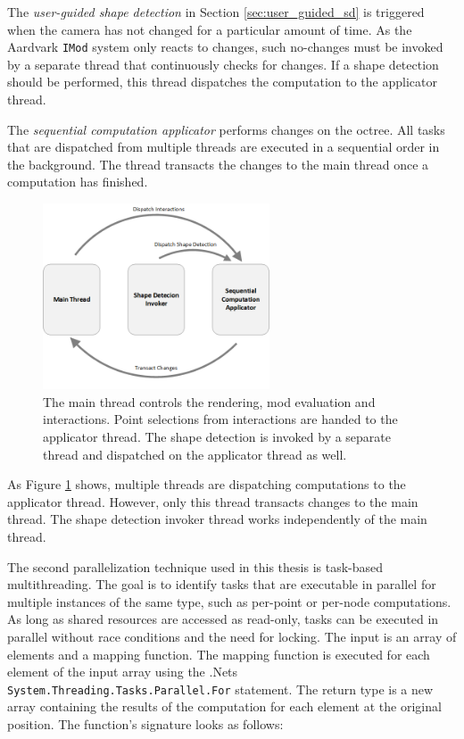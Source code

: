 \par

The \textit{user-guided shape detection} in Section \ref{sec:user_guided_sd} is triggered when the camera has not changed for a particular amount of time. As the Aardvark \verb|IMod| system only reacts to changes, such no-changes must be invoked by a separate thread that continuously checks for changes. If a shape detection should be performed, this thread dispatches the computation to the applicator thread.

\par

The \textit{sequential computation applicator} performs changes on the octree. All tasks that are dispatched from multiple threads are executed in a sequential order in the background. The thread transacts the changes to the main thread once a computation has finished. 

\begin{figure}[b]
    \centering
    \includegraphics[width=0.6\textwidth]{Implementation/multiThreading.png}
    \caption[Overview on the multi-threaded environment of the application]
		{The main thread controls the rendering, mod evaluation and interactions. Point selections from interactions are handed to the applicator thread. The shape detection is invoked by a separate thread and dispatched on the applicator thread as well.  }
    \label{fig:multiThreading}
\end{figure}

As Figure \ref{fig:multiThreading} shows, multiple threads are dispatching computations to the applicator thread. However, only this thread transacts changes to the main thread. The shape detection invoker thread works independently of the main thread. 

\par

The second parallelization technique used in this thesis is task-based multithreading. The goal is to identify tasks that are executable in parallel for multiple instances of the same type, such as per-point or per-node computations. As long as shared resources are accessed as read-only, tasks can be executed in parallel without race conditions and the need for locking. The input is an array of elements and a mapping function. The mapping function is executed for each element of the input array using the .Nets \verb|System.Threading.Tasks.Parallel.For| statement. The return type is a new array containing the results of the computation for each element at the original position. The function's signature looks as follows: 

